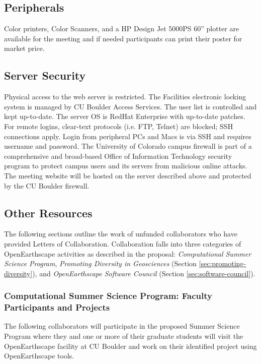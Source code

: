 
\subsection*{Peripherals}

Color printers, Color Scanners, and a HP Design Jet 5000PS 60” plotter are available for the meeting and if needed participants can print their poster for market price.

\subsection*{Server Security}

Physical access to the web server is restricted. The Facilities electronic locking system is managed by CU Boulder Access Services. The user list is controlled and kept up-to-date. The server OS is RedHat Enterprise with up-to-date patches. For remote logins, clear-text protocols (i.e. FTP, Telnet) are blocked; SSH connections apply. Login from peripheral PCs and Macs is via SSH and requires username and password. The University of Colorado campus firewall is part of a comprehensive and broad-based Office of Information Technology security program to protect campus users and its servers from malicious online attacks. The meeting website will be hosted on the server described above and protected by the CU Boulder firewall.


\subsection*{Other Resources}

The following sections outline the work of unfunded collaborators who have provided
Letters of Collaboration. Collaboration falls into three categories of OpenEarthscape activities
as described in the proposal: \textit{Computational Summer Science Program},
\textit{Promoting Diversity in Geosciences} (Section \ref{sec:promoting-diversity}), and
\textit{OpenEarthscape Software Council} (Section \ref{sec:software-council}).

\subsubsection*{Computational Summer Science Program: Faculty Participants and Projects}

The following collaborators will participate in the proposed Summer Science Program
where they and one or more of their graduate students will visit the OpenEarthscape
facility at CU Boulder and work on their identified project using OpenEarthscape tools.

